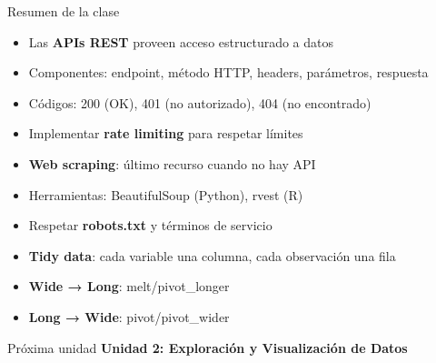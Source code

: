 \documentclass[aspectratio=169]{beamer}
\begin{document}
\begin{frame}{Resumen de la clase}
\begin{itemize}
    \item Las \textbf{APIs REST} proveen acceso estructurado a datos
    \item Componentes: endpoint, método HTTP, headers, parámetros, respuesta
    \item Códigos: 200 (OK), 401 (no autorizado), 404 (no encontrado)
    \item Implementar \textbf{rate limiting} para respetar límites
    \item \textbf{Web scraping}: último recurso cuando no hay API
    \item Herramientas: BeautifulSoup (Python), rvest (R)
    \item Respetar \textbf{robots.txt} y términos de servicio
    \item \textbf{Tidy data}: cada variable una columna, cada observación una fila
    \item \textbf{Wide → Long}: melt/pivot\_longer
    \item \textbf{Long → Wide}: pivot/pivot\_wider
\end{itemize}

\vspace{1em}

\begin{block}{Próxima unidad}
\textbf{Unidad 2: Exploración y Visualización de Datos}
\end{block}
\end{frame}
\end{document}
